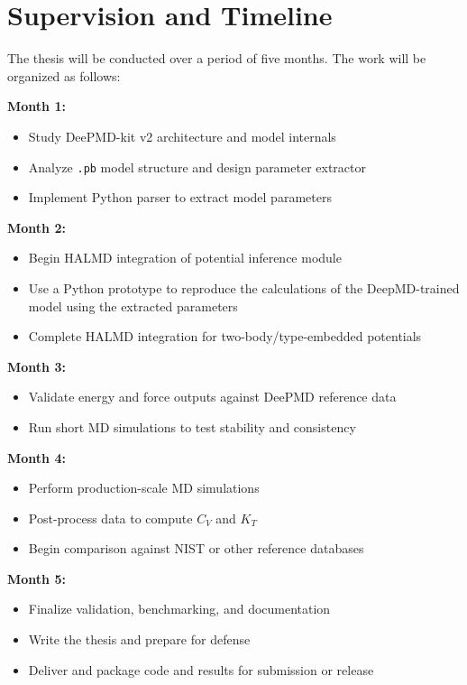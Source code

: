 \documentclass[12pt]{article}
\begin{document}
\section*{Supervision and Timeline}
The thesis will be conducted over a period of five months. The work will be organized as follows:

\textbf{Month 1:}
\begin{itemize}
    \item Study DeePMD-kit v2 architecture and model internals
    \item Analyze \texttt{.pb} model structure and design parameter extractor
    \item Implement Python parser to extract model parameters
\end{itemize}

\textbf{Month 2:}
\begin{itemize}
    \item Begin HALMD integration of potential inference module
    \item Use a Python prototype to reproduce the calculations of the DeepMD-trained model using the extracted parameters
    \item Complete HALMD integration for two-body/type-embedded potentials
\end{itemize}

\textbf{Month 3:}
\begin{itemize}
    
    \item Validate energy and force outputs against DeePMD reference data
    \item Run short MD simulations to test stability and consistency
\end{itemize}

\textbf{Month 4:}
\begin{itemize}
    \item Perform production-scale MD simulations 
    
    \item Post-process data to compute \(C_V\) and \(K_T\)
    \item Begin comparison against NIST or other reference databases
\end{itemize}

\textbf{Month 5:}
\begin{itemize}
    \item Finalize validation, benchmarking, and documentation
    \item Write the thesis and prepare for defense
    \item Deliver and package code and results for submission or release
\end{itemize}
\end{document}

